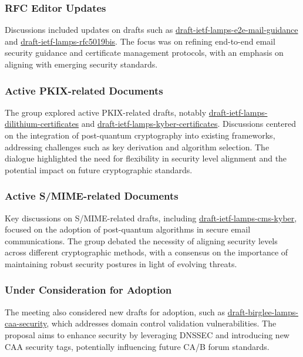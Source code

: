 \documentclass{article}
\begin{document}
\subsubsection{RFC Editor Updates}
Discussions included updates on drafts such as \href{https://datatracker.ietf.org/doc/html/draft-ietf-lamps-e2e-mail-guidance}{draft-ietf-lamps-e2e-mail-guidance} and \href{https://datatracker.ietf.org/doc/html/draft-ietf-lamps-rfc5019bis}{draft-ietf-lamps-rfc5019bis}. The focus was on refining end-to-end email security guidance and certificate management protocols, with an emphasis on aligning with emerging security standards.

\subsubsection{Active PKIX-related Documents}
The group explored active PKIX-related drafts, notably \href{https://datatracker.ietf.org/doc/html/draft-ietf-lamps-dilithium-certificates}{draft-ietf-lamps-dilithium-certificates} and \href{https://datatracker.ietf.org/doc/html/draft-ietf-lamps-kyber-certificates}{draft-ietf-lamps-kyber-certificates}. Discussions centered on the integration of post-quantum cryptography into existing frameworks, addressing challenges such as key derivation and algorithm selection. The dialogue highlighted the need for flexibility in security level alignment and the potential impact on future cryptographic standards.

\subsubsection{Active S/MIME-related Documents}
Key discussions on S/MIME-related drafts, including \href{https://datatracker.ietf.org/doc/html/draft-ietf-lamps-cms-kyber}{draft-ietf-lamps-cms-kyber}, focused on the adoption of post-quantum algorithms in secure email communications. The group debated the necessity of aligning security levels across different cryptographic methods, with a consensus on the importance of maintaining robust security postures in light of evolving threats.

\subsubsection{Under Consideration for Adoption}
The meeting also considered new drafts for adoption, such as \href{https://datatracker.ietf.org/doc/html/draft-birglee-lamps-caa-security}{draft-birglee-lamps-caa-security}, which addresses domain control validation vulnerabilities. The proposal aims to enhance security by leveraging DNSSEC and introducing new CAA security tags, potentially influencing future CA/B forum standards.
\end{document}
